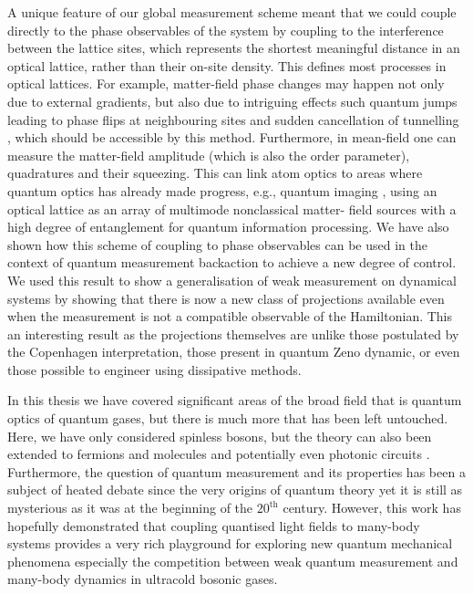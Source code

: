 A unique feature of our global measurement scheme meant that we could
couple directly to the phase observables of the system by coupling to
the interference between the lattice sites, which represents the
shortest meaningful distance in an optical lattice, rather than their
on-site density. This defines most processes in optical lattices.  For
example, matter-field phase changes may happen not only due to
external gradients, but also due to intriguing effects such quantum
jumps leading to phase flips at neighbouring sites and sudden
cancellation of tunnelling \cite{vukics2007}, which should be
accessible by this method. Furthermore, in mean-field one can measure
the matter-field amplitude (which is also the order parameter),
quadratures and their squeezing. This can link atom optics to areas
where quantum optics has already made progress, e.g., quantum imaging
\cite{golubev2010, kolobov1999}, using an optical lattice as an array
of multimode nonclassical matter- field sources with a high degree of
entanglement for quantum information processing. We have also shown
how this scheme of coupling to phase observables can be used in the
context of quantum measurement backaction to achieve a new degree of
control. We used this result to show a generalisation of weak
measurement on dynamical systems by showing that there is now a new
class of projections available even when the measurement is not a
compatible observable of the Hamiltonian. This an interesting result
as the projections themselves are unlike those postulated by the
Copenhagen interpretation, those present in quantum Zeno dynamic, or
even those possible to engineer using dissipative methods.

In this thesis we have covered significant areas of the broad field
that is quantum optics of quantum gases, but there is much more that
has been left untouched. Here, we have only considered spinless
bosons, but the theory can also been extended to fermions
\cite{atoms2015, mazzucchi2016, mazzucchi2016af} and molecules
\cite{LP2013} and potentially even photonic circuits
\cite{mazzucchi2016njp}. Furthermore, the question of quantum
measurement and its properties has been a subject of heated debate
since the very origins of quantum theory yet it is still as mysterious
as it was at the beginning of the $20^\mathrm{th}$ century. However,
this work has hopefully demonstrated that coupling quantised light
fields to many-body systems provides a very rich playground for
exploring new quantum mechanical phenomena especially the competition
between weak quantum measurement and many-body dynamics in ultracold
bosonic gases.
